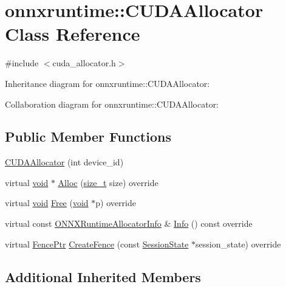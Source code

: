\hypertarget{classonnxruntime_1_1CUDAAllocator}{}\section{onnxruntime\+:\+:C\+U\+D\+A\+Allocator Class Reference}
\label{classonnxruntime_1_1CUDAAllocator}


{\ttfamily \#include $<$cuda\+\_\+allocator.\+h$>$}



Inheritance diagram for onnxruntime\+:\+:C\+U\+D\+A\+Allocator\+:


Collaboration diagram for onnxruntime\+:\+:C\+U\+D\+A\+Allocator\+:
\subsection*{Public Member Functions}
\begin{DoxyCompactItemize}
\item 
\mbox{\hyperlink{classonnxruntime_1_1CUDAAllocator_a8a35cacb1eb022672e9568efefe36db7}{C\+U\+D\+A\+Allocator}} (int device\+\_\+id)
\item 
virtual \mbox{\hyperlink{mlasi_8h_a88f941d423cb2a819b70a1358982b1a6}{void}} $\ast$ \mbox{\hyperlink{classonnxruntime_1_1CUDAAllocator_a21b66ae0d3ddcfdfd6c2bcafcffcdfda}{Alloc}} (\mbox{\hyperlink{mlasi_8h_a503efbc1c6e50825320ad909366b78ab}{size\+\_\+t}} size) override
\item 
virtual \mbox{\hyperlink{mlasi_8h_a88f941d423cb2a819b70a1358982b1a6}{void}} \mbox{\hyperlink{classonnxruntime_1_1CUDAAllocator_a72082fdae56347fdc45d4a3ac0f1e498}{Free}} (\mbox{\hyperlink{mlasi_8h_a88f941d423cb2a819b70a1358982b1a6}{void}} $\ast$p) override
\item 
virtual const \mbox{\hyperlink{structONNXRuntimeAllocatorInfo}{O\+N\+N\+X\+Runtime\+Allocator\+Info}} \& \mbox{\hyperlink{classonnxruntime_1_1CUDAAllocator_a347f391c14e4466bce42915feefa1f2f}{Info}} () const override
\item 
virtual \mbox{\hyperlink{namespaceonnxruntime_a42d52aa37e4dba8c02178f81eda99eeb}{Fence\+Ptr}} \mbox{\hyperlink{classonnxruntime_1_1CUDAAllocator_ae53976512241587aedaf1581937f12c0}{Create\+Fence}} (const \mbox{\hyperlink{classonnxruntime_1_1SessionState}{Session\+State}} $\ast$session\+\_\+state) override
\end{DoxyCompactItemize}
\subsection*{Additional Inherited Members}


